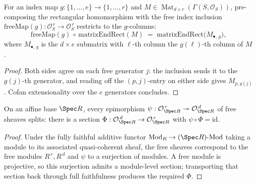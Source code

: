 \begin{lemma}
  \label{lem:gr_freeMap_matrixEndRect}
  For an index map \(g : \{1,\dots,e\} \to \{1,\dots,r\}\) and
  \(M \in \operatorname{Mat}_{d\times r}(\Gamma(S,\mathcal{O}_S))\), pre-composing the
  rectangular homomorphism with the free index inclusion
  \(\mathrm{freeMap}(g) : \mathcal{O}_S^{\,e} \to \mathcal{O}_S^{\,r}\) restricts to the
  \(g\)-columns:
  \[
    \mathrm{freeMap}(g) \,\circ\, \mathrm{matrixEndRect}(M)
      \;=\; \mathrm{matrixEndRect}\bigl(M_{\bullet,\, g}\bigr),
  \]
  where \(M_{\bullet,\, g}\) is the \(d \times e\) submatrix with \(\ell\)-th column the
  \(g(\ell)\)-th column of \(M\).
\end{lemma}
\begin{proof}
  Both sides agree on each free generator \(j\): the inclusion sends it to the \(g(j)\)-th
  generator, and reading off the \((p,j)\)-entry on either side gives \(M_{p, g(j)}\). Cofan
  extensionality over the \(e\) generators concludes.
\end{proof}

\begin{lemma}
  \label{lem:gr_exists_section_of_epi_free_spec}
  On an affine base \(\Spec R\), every epimorphism
  \(\psi : \mathcal{O}_{\Spec R}^{\,r} \twoheadrightarrow \mathcal{O}_{\Spec R}^{\,d}\) of
  free sheaves splits: there is a section
  \(\Phi : \mathcal{O}_{\Spec R}^{\,d} \to \mathcal{O}_{\Spec R}^{\,r}\) with
  \(\psi \circ \Phi = \mathrm{id}\).
\end{lemma}
\begin{proof}
  Under the fully faithful additive functor \(\mathrm{Mod}_R \to (\Spec R)\text{-Mod}\)
  taking a module to its associated quasi-coherent sheaf, the free sheaves correspond to the
  free modules \(R^{\,r}, R^{\,d}\) and \(\psi\) to a surjection of modules. A free module is
  projective, so this surjection admits a module-level section; transporting that section
  back through full faithfulness produces the required \(\Phi\).
\end{proof}

